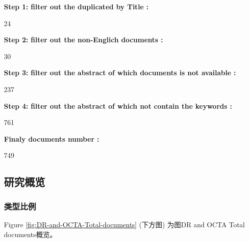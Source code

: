 \documentclass[
]{article}
\begin{document}
\begin{center}\begin{tcolorbox}[colback=gray!10, colframe=gray!50, width=0.9\linewidth, arc=1mm, boxrule=0.5pt]
\textbf{
Step 1: filter out the duplicated by Title
:}

\vspace{0.5em}

    24

\vspace{2em}


\textbf{
Step 2: filter out the non-Englich documents
:}

\vspace{0.5em}

    30

\vspace{2em}


\textbf{
Step 3: filter out the abstract of which documents is not available
:}

\vspace{0.5em}

    237

\vspace{2em}


\textbf{
Step 4: filter out the abstract of which not contain the keywords
:}

\vspace{0.5em}

    761

\vspace{2em}


\textbf{
Finaly documents number
:}

\vspace{0.5em}

    749

\vspace{2em}
\end{tcolorbox}
\end{center}

\hypertarget{overview}{%
\subsection{研究概览}\label{overview}}

\hypertarget{ux7c7bux578bux6bd4ux4f8b}{%
\subsubsection{类型比例}\label{ux7c7bux578bux6bd4ux4f8b}}

Figure \ref{fig:DR-and-OCTA-Total-documents} (下方图) 为图DR and OCTA Total documents概览。
\end{document}
